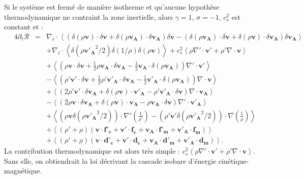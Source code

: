  Si le système est fermé de manière isotherme et qu'aucune hypothèse thermodynamique ne contraint la zone inertielle, alors $\gamma = 1$, $\sigma = -1$, $c^2_s$ est constant et :  
\begin{eqnarray}
\label{eq:turb_isot_khm3}\quad 4\partial_t \mathcal{R} &=& \nabla_{\boldsymbol{\ell}} \cdot \left<\left(\delta \left(\rho\boldsymbol{v}\right) \cdot \delta \boldsymbol{v}+ \delta \left(\rho\boldsymbol{v_A}\right) \cdot \delta \boldsymbol{v_A}\right) \delta \boldsymbol{v}  -\left(\delta \left(\rho\boldsymbol{v_A}\right) \cdot \delta \boldsymbol{v}  + \delta \left(\rho\boldsymbol{v}\right) \cdot \delta \boldsymbol{v_A}  \right) \delta \boldsymbol{v_A} \right>\nonumber\\
&& + \nabla_{\boldsymbol{\ell}} \cdot \left<  \delta \left(\rho\boldsymbol{v'_A}^2/2\right)  \delta \left(1/\rho\right) \delta\left(\rho \boldsymbol{v}\right) \right> + c^2_s\left<  \rho \nabla' \cdot \boldsymbol{v'} +\rho'\nabla \cdot \boldsymbol{v}\right>\nonumber\\
&& +\left< \left(\rho \boldsymbol{v} \cdot \delta \boldsymbol{v} +\frac{1}{2} \rho \boldsymbol{v_A} \cdot \delta \boldsymbol{v_A} -\frac{1}{2} \boldsymbol{v_A} \cdot \delta \left(\rho \boldsymbol{v_A}\right)\right) \nabla' \cdot \boldsymbol{v'} \right>\nonumber\\
&& -\left<\left( \rho' \boldsymbol{v'} \cdot \delta \boldsymbol{v} +\frac{1}{2} \rho' \boldsymbol{v'_A} \cdot \delta \boldsymbol{v_A} -\frac{1}{2} \boldsymbol{v'_A} \cdot \delta \left(\rho \boldsymbol{v_A}\right)\right) \nabla \cdot \boldsymbol{v} \right>\nonumber\\
&&+ \left<\left(2 \rho' \boldsymbol{v'} \cdot \delta \boldsymbol{v_A}+ \delta\left(\rho \boldsymbol{v}\right) \cdot \boldsymbol{v'_A} - \rho' \boldsymbol{v'_A} \cdot \delta \boldsymbol{v}  \right)\nabla \cdot \boldsymbol{v_A}\right>\nonumber\\
&&- \left<\left(2\rho \boldsymbol{v} \cdot \delta \boldsymbol{v_A} + \delta\left(\rho \boldsymbol{v}\right) \cdot \boldsymbol{v_A} - \rho \boldsymbol{v_A} \cdot \delta \boldsymbol{v}  \right)\nabla' \cdot \boldsymbol{v'_A}\right> \nonumber\\
&&+ \left< \left(\rho\boldsymbol{v} \delta \left(\rho\boldsymbol{v'_A}^2/2\right) \right) \cdot \nabla'\left(\frac{1}{\rho'}\right) - \left(\rho' \boldsymbol{v'}\delta \left(\rho\boldsymbol{v'_A}^2/2\right) \right) \cdot \nabla \left(\frac{1}{\rho}\right)\right>\nonumber\\
&&+  \left<\left(\rho' + \rho\right)\left(\boldsymbol{v} \cdot \boldsymbol{f'_c} + \boldsymbol{v'} \cdot \boldsymbol{f_c} + \boldsymbol{v_A} \cdot \boldsymbol{f'_m} + \boldsymbol{v'_A} \cdot \boldsymbol{f_m}\right) \right>\nonumber\\
&&+ \left<\left(\rho' + \rho\right)\left(\boldsymbol{v} \cdot \boldsymbol{d'_c} + \boldsymbol{v'} \cdot \boldsymbol{d_c}+\boldsymbol{v_A} \cdot \boldsymbol{d'_m} + \boldsymbol{v'_A} \cdot \boldsymbol{d_m}\right)\right> .
\end{eqnarray}
La contribution thermodynamique est alors très simple : $ c^2_s \left< \rho \nabla' \cdot \boldsymbol{v'} +\rho'\nabla \cdot \boldsymbol{v} \right>$. Sans elle, on obtiendrait la loi  décrivant la cascade isobare d'énergie cinétique-magnétique.  

